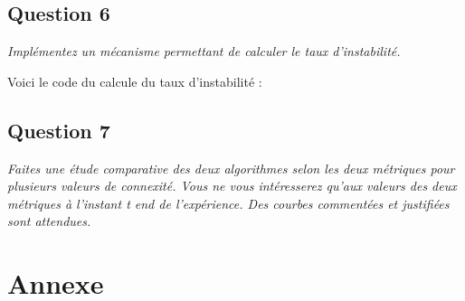 \documentclass[11pt,a4paper,sans]{report}
\begin{document}
	\section{Question 6}
	\textit{Implémentez un mécanisme permettant de calculer le taux d’instabilité.}

	\par Voici le code du calcule du taux d'instabilité :


	\section{Question 7}
	\textit{Faites une étude comparative des deux algorithmes selon les deux métriques pour plusieurs valeurs de connexité. Vous ne vous intéresserez qu’aux valeurs des deux métriques à l’instant t end de l’expérience. Des courbes commentées et justifiées sont attendues.}







	\newpage
	\chapter{Annexe}
\end{document}
